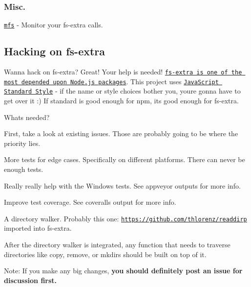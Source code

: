 \subsubsection*{Misc.}


\begin{DoxyItemize}
\item \href{https://github.com/cadorn/mfs}{\tt mfs} -\/ Monitor your fs-\/extra calls.
\end{DoxyItemize}

\subsection*{Hacking on fs-\/extra }

Wanna hack on {\ttfamily fs-\/extra}? Great! Your help is needed! \href{http://nodei.co/npm/fs-extra.png?downloads=true&downloadRank=true&stars=true}{\tt fs-\/extra is one of the most depended upon Node.\+js packages}. This project uses \href{https://github.com/feross/standard}{\tt Java\+Script Standard Style} -\/ if the name or style choices bother you, you\textquotesingle{}re gonna have to get over it \+:) If {\ttfamily standard} is good enough for {\ttfamily npm}, it\textquotesingle{}s good enough for {\ttfamily fs-\/extra}.

\href{https://github.com/feross/standard}{\tt }

What\textquotesingle{}s needed?
\begin{DoxyItemize}
\item First, take a look at existing issues. Those are probably going to be where the priority lies.
\item More tests for edge cases. Specifically on different platforms. There can never be enough tests.
\item Really really help with the Windows tests. See appveyor outputs for more info.
\item Improve test coverage. See coveralls output for more info.
\item A directory walker. Probably this one\+: \href{https://github.com/thlorenz/readdirp}{\tt https\+://github.\+com/thlorenz/readdirp} imported into {\ttfamily fs-\/extra}.
\item After the directory walker is integrated, any function that needs to traverse directories like {\ttfamily copy}, {\ttfamily remove}, or {\ttfamily mkdirs} should be built on top of it.
\end{DoxyItemize}

Note\+: If you make any big changes, {\bfseries you should definitely post an issue for discussion first.}

